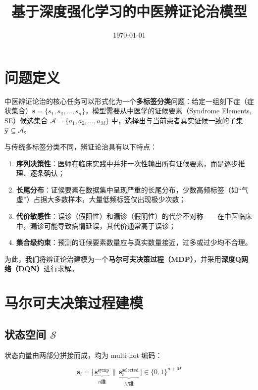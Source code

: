 \documentclass[12pt,a4paper]{article}
\title{\textbf{基于深度强化学习的中医辨证论治模型}}
\author{}
\date{\today}
\newcommand{\Sset}{\mathcal{S}}
\newcommand{\Aset}{\mathcal{A}}
\newcommand{\symptoms}{\mathbf{s}}
\newcommand{\predSE}{\hat{\mathbf{y}}}
\begin{document}
\maketitle

\section{问题定义}

中医辨证论治的核心任务可以形式化为一个\textbf{多标签分类}问题：给定一组刻下症（症状集合）$\symptoms = \{s_1, s_2, \ldots, s_n\}$，模型需要从中医学的证候要素（Syndrome Elements, SE）候选集合 $\Aset = \{a_1, a_2, \ldots, a_M\}$ 中，选择出与当前患者真实证候一致的子集 $\predSE \subseteq \Aset$。

与传统多标签分类不同，辨证论治具有以下特点：
\begin{enumerate}[label=(\arabic*)]
    \item \textbf{序列决策性}：医师在临床实践中并非一次性输出所有证候要素，而是逐步推理、逐条确认；
    \item \textbf{长尾分布}：证候要素在数据集中呈现严重的长尾分布，少数高频标签（如``气虚''）占据大多数样本，大量低频标签仅出现极少次数；
    \item \textbf{代价敏感性}：误诊（假阳性）和漏诊（假阴性）的代价不对称——在中医临床中，漏诊可能导致病情延误，其代价通常高于误诊；
    \item \textbf{集合级约束}：预测的证候要素数量应与真实数量接近，过多或过少均不合理。
\end{enumerate}

为此，我们将辨证论治建模为一个\textbf{马尔可夫决策过程（MDP）}，并采用\textbf{深度Q网络（DQN）}进行求解。

\section{马尔可夫决策过程建模}

\subsection{状态空间 $\Sset$}

状态向量由两部分拼接而成，均为 multi-hot 编码：

\begin{equation}
    \mathbf{s}_t = \big[\,\underbrace{\mathbf{s}^{\text{symp}}}_{n\text{维}}\, \|\, \underbrace{\mathbf{s}^{\text{selected}}_t}_{M\text{维}}\,\big] \in \{0,1\}^{n+M}
\end{equation}
\end{document}
